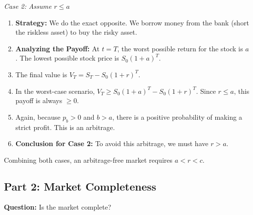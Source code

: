 \vspace{0.5em}
\noindent \textit{Case 2: Assume $r \le a$}
\begin{enumerate}
    \item \textbf{Strategy:} We do the exact opposite. We borrow money from the bank (short the riskless asset) to buy the risky asset. 
    \item \textbf{Analyzing the Payoff:} At $t=T$, the worst possible return for the stock is $a$. The lowest possible stock price is $S_0(1+a)^T$.
    \item The final value is $V_T = S_T - S_0(1+r)^T$.
    \item In the worst-case scenario, $V_T \ge S_0(1+a)^T - S_0(1+r)^T$. Since $r \le a$, this payoff is always $\ge 0$. 
    \item Again, because $p_b > 0$ and $b > a$, there is a positive probability of making a strict profit. This is an arbitrage.
    \item \textbf{Conclusion for Case 2:} To avoid this arbitrage, we must have $r > a$.
\end{enumerate}

Combining both cases, an arbitrage-free market requires $a < r < c$.

\subsection{Part 2: Market Completeness}

\textbf{Question:} Is the market complete?

